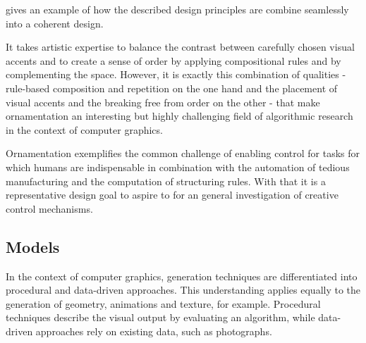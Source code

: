  gives an example of how the described design principles are combine seamlessly into a coherent design.

It takes artistic expertise to balance the contrast between carefully chosen visual accents and to create a sense of order by applying compositional rules and by complementing the space. However, it is exactly this combination of qualities - rule-based composition and repetition on the one hand and the placement of visual accents and the breaking free from order on the other - that make ornamentation an interesting but highly challenging field of algorithmic research in the context of computer graphics.

Ornamentation exemplifies the common challenge of enabling control for tasks for which humans are indispensable in combination with the automation of tedious manufacturing and the computation of structuring rules. With that it is a representative design goal to aspire to for an general investigation of creative control mechanisms.







\subsection{Models}
\label{sec:models}

In the context of computer graphics, generation techniques are differentiated into procedural and data-driven approaches. This understanding applies equally to the generation of geometry, animations and texture, for example. 
Procedural techniques describe the visual output by evaluating an algorithm, while data-driven approaches rely on existing data, such as photographs.
 
